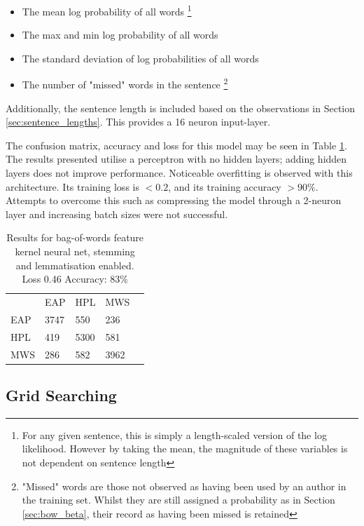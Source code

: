   \begin{itemize}
  \item The mean log probability of all words \footnote{For any given sentence, this is simply a length-scaled version of the log likelihood. However by taking the mean, the magnitude of these variables is not dependent on sentence length}
  \item The max and min log probability of all words
  \item The standard deviation of log probabilities of all words
  \item The number of "missed" words in the sentence \footnote{"Missed" words are those not observed as having been used by an author in the training set. Whilst they are still assigned a probability as in Section \ref{sec:bow_beta}, their record as having been missed is retained}
  \end{itemize}
  
 Additionally, the sentence length is included based on the observations in Section \ref{sec:sentence_lengths}. This provides a 16 neuron input-layer.
 
 The confusion matrix, accuracy and loss for this model may be seen in Table \ref{tab:bow_nn_res}. The results presented utilise a perceptron with no hidden layers; adding hidden layers does not improve performance. Noticeable overfitting is observed with this architecture. Its training loss is $<0.2$, and its training accuracy $>90\%$. Attempts to overcome this such as compressing the model through a 2-neuron layer and increasing batch sizes were not successful.
  
\begin{table}[h]
\centering
\begin{tabular}{m{1cm}|m{1cm}|m{1cm}|m{1cm}|m{0cm}}
\multicolumn{1}{m{1cm}}{} & \multicolumn{1}{m{1cm}}{EAP} & \multicolumn{1}{m{1cm}}{HPL} & \multicolumn{1}{m{1cm}}{MWS} &\\[5pt]
\cline{2-4}
EAP & 3747 & 550 & 236 & \\[5pt]
\cline{2-4}
HPL & 419 & 5300 & 581 & \\[5pt]
\cline{2-4}
MWS & 286 & 582 & 3962 & \\[5pt]
\cline{2-4}
\end{tabular}
\caption{Results for bag-of-words feature kernel neural net, stemming and lemmatisation enabled.\\Loss 0.46 Accuracy: 83\% }
\label{tab:bow_nn_res}
\end{table}
  
  \subsection{Grid Searching}
  \label{sec:grid_search}

